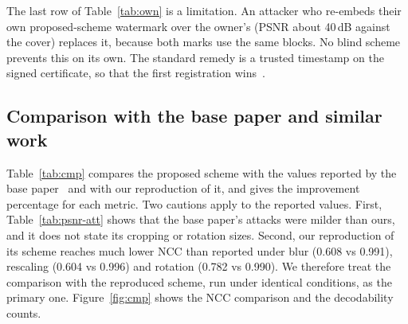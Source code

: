 \documentclass[11pt,a4paper]{article}
\begin{document}
The last row of Table~\ref{tab:own} is a limitation. An attacker who re-embeds their own proposed-scheme watermark over the owner's (PSNR about 40\,dB against the cover) replaces it, because both marks use the same blocks. No blind scheme prevents this on its own. The standard remedy is a trusted timestamp on the signed certificate, so that the first registration wins~\cite{TODO}. %

\FloatBarrier
\subsection{Comparison with the base paper and similar work}\label{sec:res-cmp}

Table~\ref{tab:cmp} compares the proposed scheme with the values reported by the base paper~\cite{sanivarapu2022} and with our reproduction of it, and gives the improvement percentage for each metric. Two cautions apply to the reported values. First, Table~\ref{tab:psnr-att} shows that the base paper's attacks were milder than ours, and it does not state its cropping or rotation sizes. Second, our reproduction of its scheme reaches much lower NCC than reported under blur (0.608 vs 0.991), rescaling (0.604 vs 0.996) and rotation (0.782 vs 0.990). We therefore treat the comparison with the reproduced scheme, run under identical conditions, as the primary one. Figure~\ref{fig:cmp} shows the NCC comparison and the decodability counts.
\end{document}

